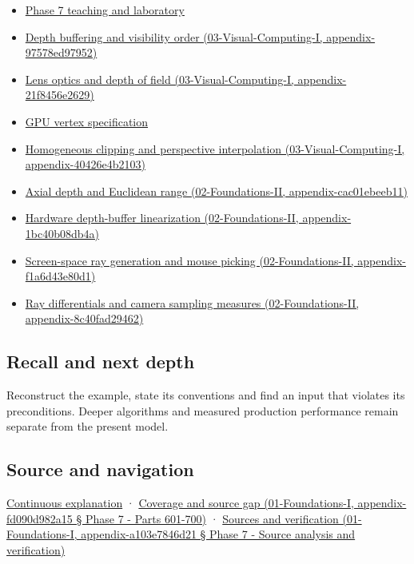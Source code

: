 \begin{itemize}
\item
  \href{Continuous\%20Notes/Computing\%20Foundations\%20-\%20From\%20Bits\%20to\%20C++\%20and\%20Systems\%20APIs\#Keep\%20the\%20promises\%20visible\%20while\%20moving\%20between\%20representations}{Phase 7 teaching and laboratory}
\item
  \href{}{Depth buffering and visibility order (03-Visual-Computing-I, appendix-97578ed97952)}
\item
  \href{}{Lens optics and depth of field (03-Visual-Computing-I, appendix-21f8456e2629)}
\item
  \hyperref[appendix-749ba51a6c25]{GPU vertex specification}
\item
  \href{}{Homogeneous clipping and perspective interpolation (03-Visual-Computing-I, appendix-40426e4b2103)}
\item
  \href{}{Axial depth and Euclidean range (02-Foundations-II, appendix-cac01ebeeb11)}
\item
  \href{}{Hardware depth-buffer linearization (02-Foundations-II, appendix-1bc40b08db4a)}
\item
  \href{}{Screen-space ray generation and mouse picking (02-Foundations-II, appendix-f1a6d43e80d1)}
\item
  \href{}{Ray differentials and camera sampling measures (02-Foundations-II, appendix-8c40fad29462)}
\end{itemize}

\subsection{Recall and next depth}\label{recall-and-next-depth}

Reconstruct the example, state its conventions and find an input that violates its preconditions. Deeper algorithms and measured production performance remain separate from the present model.

\subsection{Source and navigation}\label{source-and-navigation}

\href{Continuous\%20Notes/Computing\%20Foundations\%20-\%20From\%20Bits\%20to\%20C++\%20and\%20Systems\%20APIs\#Keep\%20the\%20promises\%20visible\%20while\%20moving\%20between\%20representations}{Continuous explanation} · \href{}{Coverage and source gap (01-Foundations-I, appendix-fd090d982a15 § Phase 7 - Parts 601-700)} · \href{}{Sources and verification (01-Foundations-I, appendix-a103e7846d21 § Phase 7 - Source analysis and verification)}


